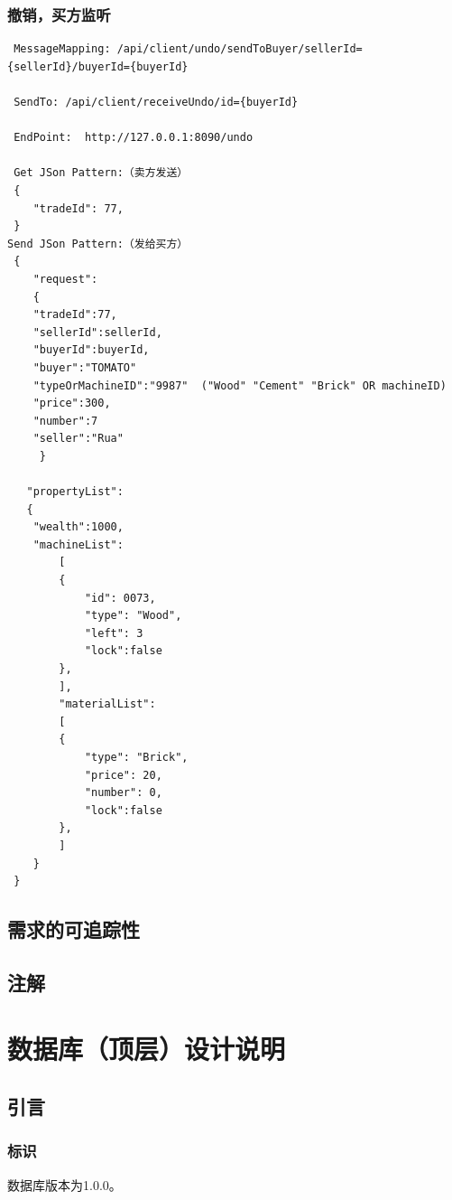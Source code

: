 \documentclass{article}
\begin{document}
				\subsubsection{撤销，买方监听}
\begin{lstlisting}
 MessageMapping: /api/client/undo/sendToBuyer/sellerId={sellerId}/buyerId={buyerId}

 SendTo: /api/client/receiveUndo/id={buyerId}

 EndPoint:  http://127.0.0.1:8090/undo

 Get JSon Pattern:（卖方发送）
 {
    "tradeId": 77,
 }
Send JSon Pattern:（发给买方）
 {
    "request":
    {
    "tradeId":77,
    "sellerId":sellerId,
    "buyerId":buyerId,
    "buyer":"TOMATO"
    "typeOrMachineID":"9987"  ("Wood" "Cement" "Brick" OR machineID)
    "price":300,
    "number":7
    "seller":"Rua"
     }

   "propertyList":
   {
   	"wealth":1000,
   	"machineList":
    	[
        {
            "id": 0073,
            "type": "Wood",
            "left": 3
            "lock":false
        },
    	],
    	"materialList":
    	[
        {
            "type": "Brick",
            "price": 20,
            "number": 0,
            "lock":false
        },
    	]
    }
 }

\end{lstlisting}

		\subsection{需求的可追踪性}

		\subsection{注解}
		
\section{数据库（顶层）设计说明}
\label{数据库（顶层）设计说明}
\subsection{引言}
\subsubsection{标识}

数据库版本为1.0.0。
\end{document}
